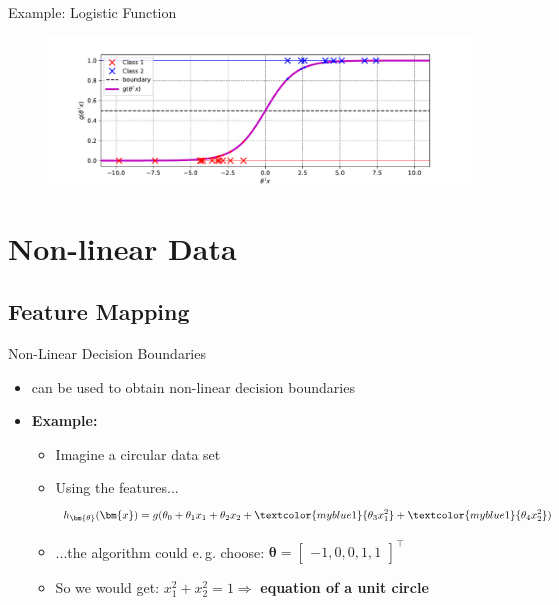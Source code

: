 \begin{frame}{Example: Logistic Function}{}
	\vspace*{-7mm}
	\begin{figure}
		\centering
		\includegraphics[scale=0.6]{07_logistic_regression/02_img/logreg_example_linear_logistic_function}
	\end{figure}
\end{frame}


\section{Non-linear Data}

\subsection{Feature Mapping}

\begin{frame}{Non-Linear Decision Boundaries}{}
	\begin{itemize}
		\item {} can be used to obtain non-linear decision boundaries
		\item \textbf{Example:}
		\begin{itemize}
			\item Imagine a circular data set
			\item Using the features...
			\begin{equation*}
				h_{\bm{\theta}}(\bm{x}) = g(\theta_0 + \theta_1 x_1 + \theta_2 x_2 +
				\textcolor{myblue1}{\theta_3 x_1^2} + \textcolor{myblue1}{\theta_4 x_2^2})
			\end{equation*}
			\item ...the algorithm could e.\,g. choose: $\bm{\theta} =
				\begin{bmatrix} -1, 0, 0, 1, 1 \end{bmatrix}^{\intercal}$
			\item So we would get: $x_1^2 + x_2^2 = 1 \Rightarrow$ \textbf{equation of a unit circle}
		\end{itemize}
	\end{itemize}
\end{frame}


